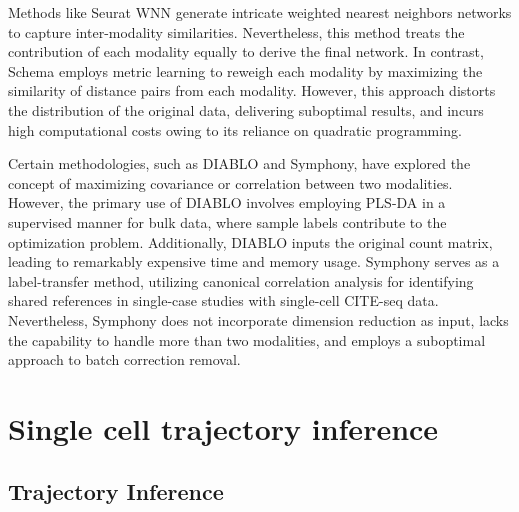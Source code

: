 Methods like Seurat WNN generate intricate weighted nearest neighbors networks to capture inter-modality similarities. Nevertheless, this method treats the contribution of each modality equally to derive the final network. In contrast, Schema employs metric learning to reweigh each modality by maximizing the similarity of distance pairs from each modality. However, this approach distorts the distribution of the original data, delivering suboptimal results, and incurs high computational costs owing to its reliance on quadratic programming.

Certain methodologies, such as DIABLO and Symphony, have explored the concept of maximizing covariance or correlation between two modalities. However, the primary use of DIABLO involves employing PLS-DA in a supervised manner for bulk data, where sample labels contribute to the optimization problem. Additionally, DIABLO inputs the original count matrix, leading to remarkably expensive time and memory usage. Symphony serves as a label-transfer method, utilizing canonical correlation analysis for identifying shared references in single-case studies with single-cell CITE-seq data. Nevertheless, Symphony does not incorporate dimension reduction as input, lacks the capability to handle more than two modalities, and employs a suboptimal approach to batch correction removal.

\section{Single cell trajectory inference}
\label{methods:TI}

\subsection{Trajectory Inference}

